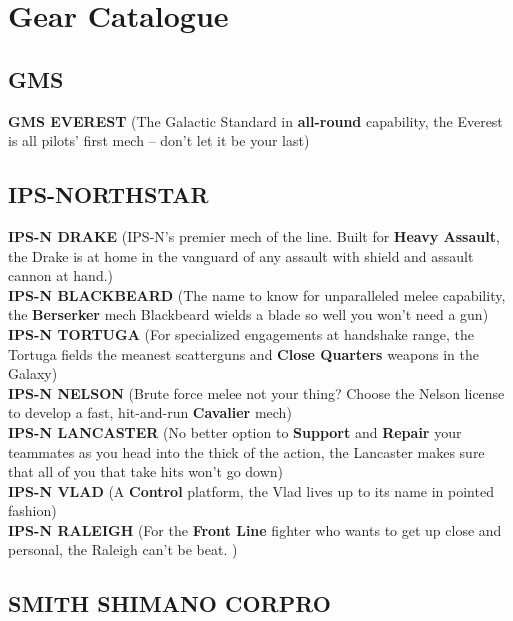 \section{Gear Catalogue}

\subsection*{GMS}

\textbf{GMS EVEREST} (The Galactic Standard in \textbf{all-round} capability, the Everest is all pilots’ first mech -- don’t let it be your last)

\subsection*{IPS-NORTHSTAR}

\textbf{IPS-N DRAKE} (IPS-N’s premier mech of the line. Built for \textbf{Heavy Assault}, the Drake is at home in the vanguard of any assault with shield and assault cannon at hand.)\\ 
\textbf{IPS-N BLACKBEARD} (The name to know for unparalleled melee capability, the \textbf{Berserker} mech Blackbeard wields a blade so well you won’t need a gun)\\
\textbf{IPS-N TORTUGA} (For specialized engagements at handshake range, the Tortuga fields the meanest scatterguns and \textbf{Close Quarters} weapons in the Galaxy)\\
\textbf{IPS-N NELSON} (Brute force melee not your thing? Choose the Nelson license to develop a fast, hit-and-run \textbf{Cavalier} mech)\\
\textbf{IPS-N LANCASTER} (No better option to \textbf{Support} and \textbf{Repair} your teammates as you head into the thick of the action, the Lancaster makes sure that all of you that take hits won’t go down)\\
\textbf{IPS-N VLAD} (A \textbf{Control} platform, the Vlad lives up to its name in pointed fashion)\\
\textbf{IPS-N RALEIGH} (For the \textbf{Front Line} fighter who wants to get up close and personal, the Raleigh can’t be beat. )

\subsection*{SMITH SHIMANO CORPRO}

